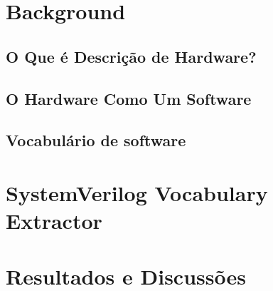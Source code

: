 \documentclass[12pt, twocolumn, a4paper]{article}
\begin{document}
	\section{Background}
	\subsection{O Que é Descrição de Hardware?}
	\subsection{O Hardware Como Um Software}
	\subsection{Vocabulário de software}
	\section{SystemVerilog Vocabulary Extractor}
	\section{Resultados e Discussões}
	
	
\end{document}
